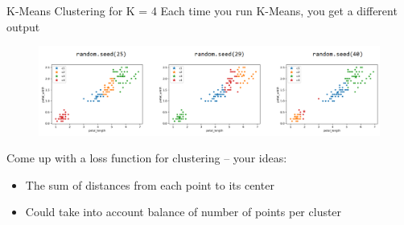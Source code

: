 \documentclass[aspectratio=169]{../latex_main/tntbeamer}  %
\begin{document}
	
	\begin{frame}{K-Means Clustering for K = 4}
	    Each time you run K-Means, you get a different output
	    \begin{figure}
	        \centering
	        \includegraphics[scale=.4]{Bild22}
	    \end{figure}
	    Come up with a loss function for clustering -- your ideas:
	    \begin{itemize}
	        \item The sum of distances from each point to its center
	        \item Could take into account balance of number of points per cluster
	    \end{itemize}
	\end{frame}
	
\end{document}

